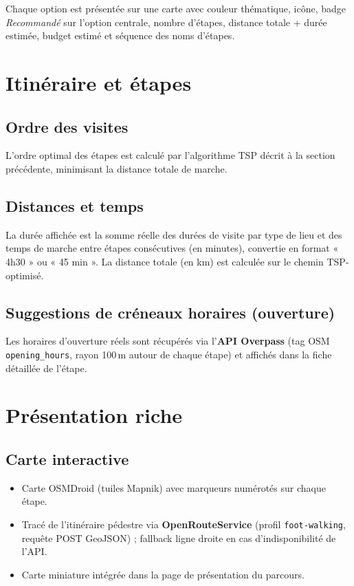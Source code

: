\documentclass[a4paper,11pt]{article}
\begin{document}
Chaque option est présentée sur une carte avec couleur thématique, icône,
badge \textit{Recommandé} sur l'option centrale, nombre d'étapes,
distance totale + durée estimée, budget estimé et séquence des noms d'étapes.

\section{Itinéraire et étapes}

\subsection{Ordre des visites}
L'ordre optimal des étapes est calculé par l'algorithme TSP décrit
à la section précédente, minimisant la distance totale de marche.

\subsection{Distances et temps}
La durée affichée est la somme réelle des durées de visite par type de lieu
et des temps de marche entre étapes consécutives (en minutes), convertie en
format « 4h30 » ou « 45 min ».
La distance totale (en km) est calculée sur le chemin TSP-optimisé.

\subsection{Suggestions de créneaux horaires (ouverture)}
Les horaires d'ouverture réels sont récupérés via l'\textbf{API Overpass}
(tag OSM \texttt{opening\_hours}, rayon 100\,m autour de chaque étape) et
affichés dans la fiche détaillée de l'étape.

\section{Présentation riche}

\subsection{Carte interactive}
\begin{itemize}[leftmargin=1.5em]
  \item Carte OSMDroid (tuiles Mapnik) avec marqueurs numérotés sur chaque étape.
  \item Tracé de l'itinéraire pédestre via \textbf{OpenRouteService}
        (profil \texttt{foot-walking}, requête POST GeoJSON) ; fallback ligne
        droite en cas d'indisponibilité de l'API.
  \item Carte miniature intégrée dans la page de présentation du parcours.
\end{itemize}
\end{document}
